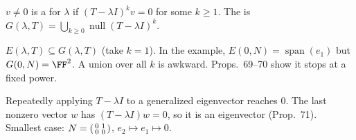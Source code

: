\documentclass[10pt]{scrartcl}
\newenvironment{fig}{\par\needspace{9\baselineskip}\medskip\begin{center}}{\end{center}\medskip}
\newcommand{\figcap}[1]{\par\vspace{3pt}\begin{minipage}{0.86\linewidth}\small\centering #1\end{minipage}}
\DeclareMathOperator{\nul}{null}
\DeclareMathOperator{\spn}{span}
\begin{document}
\begin{definition*}
  $v\ne0$ is a  for $\lambda$ if $(T-\lambda I)^kv=0$ for some $k\ge1$. The  is $G(\lambda,T)=\bigcup_{k\ge0}\nul(T-\lambda I)^k$.
\end{definition*}
\begin{itemize}
  \ii $E(\lambda,T)\subseteq G(\lambda,T)$ (take $k=1$). In the example, $E(0,N)=\spn(e_1)$ but $G(0,N)=\FF^2$.
  \ii A union over all $k$ is awkward. Props.~69--70 show it stops at a fixed power.
\end{itemize}
\begin{fig}
\figcap{Repeatedly applying $T-\lambda I$ to a generalized eigenvector reaches $0$. The last nonzero vector $w$ has $(T-\lambda I)w=0$, so it is an eigenvector (Prop.~71). Smallest case: $N=\begin{psmallmatrix}0&1\\0&0\end{psmallmatrix}$, $e_2\mapsto e_1\mapsto0$.}
\end{fig}
\end{document}
